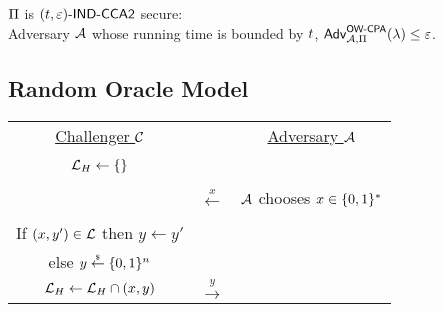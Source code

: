 \documentclass{article}
\begin{document}
$\Pi$ is $(t, \varepsilon)\textsf{-}\textsf{IND-CCA2}$ secure: \\
Adversary $\mathcal{A}$ whose running time is bounded by $t$,
$\textsf{Adv}^{\textsf{OW-CPA}}_{\mathcal{A}, \Pi}(\lambda) \le \varepsilon$.

\subsection{Random Oracle Model}

\begin{tcolorbox}[colback=white]
	\centering
	\begin{tabularx}{\linewidth}{CcC}
		\underline{Challenger $\mathcal{C}$} & 
		 & 
		\underline{Adversary $\mathcal{A}$} \\

		 \\

		 $\orcl_{\hash} \gets \set$ &&\\

		 \\

		& $\xleftarrow{x}$ & $\mathcal{A}$ chooses $x \in \{0, 1\}^*$ \\

		\\

		If $(x, y') \in \mathcal{L}$ then $y \gets y'$ \\
		else $y \overset{{\scriptscriptstyle\$}}{\leftarrow} \{0, 1\}^{n}$ \\
		$\mathcal{L}_{H} \gets \mathcal{L}_{H} \cap (x, y)$ &
		$\xrightarrow{y}$ & \\

  \end{tabularx}
\end{tcolorbox}
\end{document}
